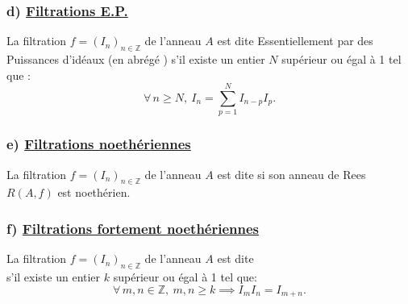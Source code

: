 \subsubsection{d) \underline{Filtrations E.P.}}
\begin{madefinition}
	La filtration $f = (I_n)_{n \in \mathbb{Z}}$ de l'anneau $A$ est dite Essentiellement par des Puissances d'idéaux (en abrégé ) s'il existe un entier $N $ supérieur ou égal à 1 tel que :
	\[ \forall \, n \geqslant N, \ I_n =\sum_{p=1}^{N} I_{n-p}I_p. \]
\end{madefinition}
\subsubsection{e) \underline{Filtrations noethériennes}}
\begin{madefinition}
	La filtration $f = (I_n)_{n \in \mathbb{Z}}$ de l'anneau $A$ est dite  si son anneau de Rees ${R}(A,f)$ est noethérien.
\end{madefinition}
\subsubsection{f) \underline{Filtrations fortement noethériennes}}
\begin{madefinition}
	La filtration $f = (I_n)_{n \in \mathbb{Z}}$ de l'anneau $A$ est dite \\  s'il existe un entier $k $ supérieur ou égal à 1 tel que:
	\[ \forall \, m, n \in \mathbb{Z}, \ m, n \geqslant k \implies I_m I_n = I_{m+n}. \]
\end{madefinition}


